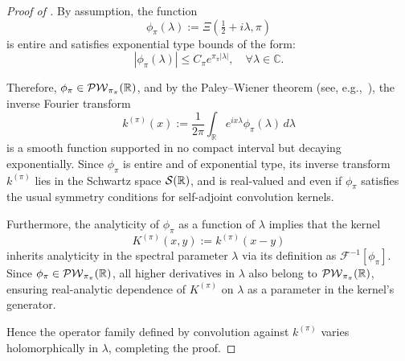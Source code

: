 \begin{proof}[Proof of ]
By assumption, the function
\[
\phi_\pi(\lambda) := \Xi\left( \tfrac{1}{2} + i\lambda, \pi \right)
\]
is entire and satisfies exponential type bounds of the form:
\[
|\phi_\pi(\lambda)| \le C_\pi e^{\pi_\pi |\lambda|}, \quad \forall \lambda \in \mathbb{C}.
\]

Therefore, \( \phi_\pi \in \mathcal{PW}_{\pi_\pi}(\mathbb{R}) \), and by the Paley–Wiener theorem (see, e.g.,~\cite[Thm.~IX.12]{ReedSimon1975II}), the inverse Fourier transform
\[
k^{(\pi)}(x) := \frac{1}{2\pi} \int_{\mathbb{R}} e^{i x \lambda} \phi_\pi(\lambda) \, d\lambda
\]
is a smooth function supported in no compact interval but decaying exponentially. Since \( \phi_\pi \) is entire and of exponential type, its inverse transform \( k^{(\pi)} \) lies in the Schwartz space \( \mathcal{S}(\mathbb{R}) \), and is real-valued and even if \( \phi_\pi \) satisfies the usual symmetry conditions for self-adjoint convolution kernels.

Furthermore, the analyticity of \( \phi_\pi \) as a function of \( \lambda \) implies that the kernel
\[
K^{(\pi)}(x, y) := k^{(\pi)}(x - y)
\]
inherits analyticity in the spectral parameter \( \lambda \) via its definition as \( \mathcal{F}^{-1}[\phi_\pi] \). Since \( \phi_\pi \in \mathcal{PW}_{\pi_\pi}(\mathbb{R}) \), all higher derivatives in \( \lambda \) also belong to \( \mathcal{PW}_{\pi_\pi}(\mathbb{R}) \), ensuring real-analytic dependence of \( K^{(\pi)} \) on \( \lambda \) as a parameter in the kernel’s generator.

Hence the operator family defined by convolution against \( k^{(\pi)} \) varies holomorphically in \( \lambda \), completing the proof.
\end{proof}
